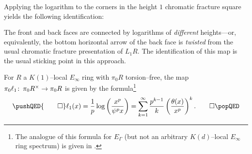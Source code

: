 \begin{remark}
Applying the logarithm to the corners in the height $1$ chromatic fracture square yields the following identification:
\begin{center}
\end{center}
The front and back faces are connected by logarithms of \emph{different} heights---or, equivalently, the bottom horizontal arrow of the back face is \emph{twisted} from the usual chromatic fracture presentation of $L_1 R$.  The identification of this map is the usual sticking point in this approach.
\end{remark}

\begin{theorem}
For $R$ a $K(1)$--local $E_\infty$ ring with $\pi_0 R$ torsion--free, the map $\pi_0 \ell_1\colon\thinspace \pi_0 R^\times \to \pi_0 R$ is given by the formula\footnote{The analogue of this formula for $E_\Gamma$ (but not an arbitrary $K(d)$--local $E_\infty$ ring spectrum) is given in \cite[Subsection 1.10]{RezkLogarithm}.} \[\pushQED{\qed} \ell_1(x) = \frac{1}{p} \log\left(\frac{x^p}{\psi^p x}\right) = \sum_{k=1}^\infty \frac{p^{k-1}}{k} \left(\frac{\theta(x)}{x^p}\right)^k. \qedhere \popQED\]
\end{theorem}

